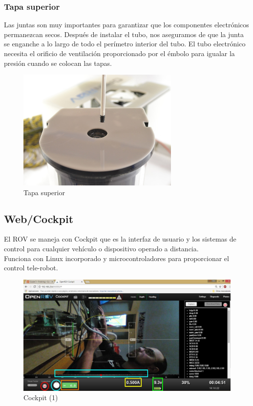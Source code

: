 \subsubsection{Tapa superior}
\label{subsubsec:tapa}
Las juntas son muy importantes para garantizar que los componentes electrónicos permanezcan secos.
Después de instalar el tubo, nos aseguramos  de que la junta se enganche a lo largo de todo el perímetro interior del tubo.
El tubo electrónico necesita el orificio de ventilación proporcionado por el émbolo para igualar la presión cuando se colocan las tapas.
\begin{figure} [hbtp]
\begin{center}
  \includegraphics[width=8cm]{img/cap3/3_4/tapa_superior}
\end{center}
\caption{Tapa superior}
\label{fig:tapa_sup}
\end{figure}  
       
\subsection{Web/Cockpit}
\label{subsec:cockpit}
El ROV se maneja con Cockpit que es la interfaz de usuario y los sistemas de control para cualquier vehículo o dispositivo operado a distancia.
\\Funciona con Linux incorporado y microcontroladores para proporcionar el control tele-robot.

\begin{figure} [hbtp]
\begin{center}
  \includegraphics[width=15cm]{img/cap3/3_5/cockpit1}
\end{center}
\caption{Cockpit (1)}
\label{fig:cockpit1}
\end{figure}

